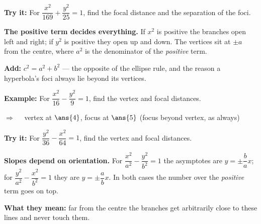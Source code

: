 \documentclass[12pt]{article}
\begin{document}
\begin{tryitbox}
\textbf{Try it:} \quad For $\dfrac{x^2}{169} + \dfrac{y^2}{25} = 1$, find the focal distance and the separation of the foci.\\[2pt]
\end{tryitbox}


\begin{formulabox}
\textbf{The positive term decides everything.} If $x^2$ is positive the branches open left
and right; if $y^2$ is positive they open up and down. The vertices sit at $\pm a$ from the
centre, where $a^2$ is the denominator of the \emph{positive} term.\par
\textbf{Add:} $c^2 = a^2 + b^2$ --- the opposite of the ellipse rule, and the reason a
hyperbola's foci always lie beyond its vertices.
\end{formulabox}

\begin{examplebox}
\textbf{Example:} \quad For $\dfrac{x^2}{16} - \dfrac{y^2}{9} = 1$, find the vertex and focal distances.

$\Rightarrow\quad$ vertex at $\ans{4}$, \quad focus at $\ans{5}$ \quad (focus beyond vertex, as always)
\end{examplebox}

\begin{tryitbox}
\textbf{Try it:} \quad For $\dfrac{y^2}{36} - \dfrac{x^2}{64} = 1$, find the vertex and focal distances.\\[2pt]
\end{tryitbox}


\begin{formulabox}
\textbf{Slopes depend on orientation.} For $\dfrac{x^2}{a^2} - \dfrac{y^2}{b^2} = 1$ the
asymptotes are $y = \pm\dfrac{b}{a}x$; for $\dfrac{y^2}{a^2} - \dfrac{x^2}{b^2} = 1$ they are
$y = \pm\dfrac{a}{b}x$. In both cases the number over the \emph{positive} term goes on top.\par
\textbf{What they mean:} far from the centre the branches get arbitrarily close to these
lines and never touch them.
\end{formulabox}
\end{document}
